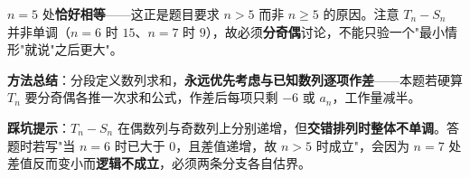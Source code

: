 \begin{answer}
$n=5$ 处\textbf{恰好相等}——这正是题目要求 $n>5$ 而非 $n\ge5$ 的原因。注意 $T_n-S_n$ 并非单调（$n=6$ 时 $15$、$n=7$ 时 $9$），故必须\textbf{分奇偶}讨论，不能只验一个"最小情形"就说"之后更大"。

\begin{gktip}
\textbf{方法总结}：分段定义数列求和，\textbf{永远优先考虑与已知数列逐项作差}——本题若硬算 $T_n$ 要分奇偶各推一次求和公式，作差后每项只剩 $-6$ 或 $a_n$，工作量减半。

\textbf{踩坑提示}：$T_n-S_n$ 在偶数列与奇数列上分别递增，但\textbf{交错排列时整体不单调}。答题时若写"当 $n=6$ 时已大于 $0$，且差值递增，故 $n>5$ 时成立"，会因为 $n=7$ 处差值反而变小而\textbf{逻辑不成立}，必须两条分支各自估界。
\end{gktip}



\par\medskip

\end{answer}
